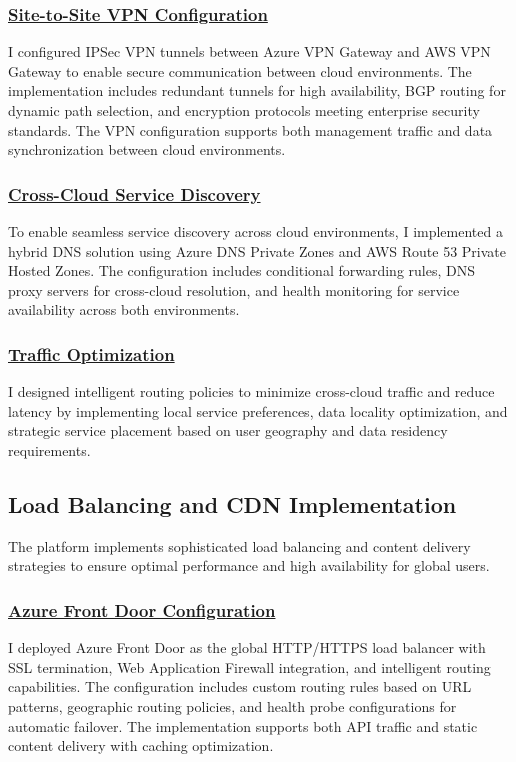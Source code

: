 \subsubsection*{\underline{Site-to-Site VPN Configuration}}
I configured IPSec VPN tunnels between Azure VPN Gateway and AWS VPN Gateway to enable secure communication between cloud environments. The implementation includes redundant tunnels for high availability, BGP routing for dynamic path selection, and encryption protocols meeting enterprise security standards. The VPN configuration supports both management traffic and data synchronization between cloud environments.

\subsubsection*{\underline{Cross-Cloud Service Discovery}}
To enable seamless service discovery across cloud environments, I implemented a hybrid DNS solution using Azure DNS Private Zones and AWS Route 53 Private Hosted Zones. The configuration includes conditional forwarding rules, DNS proxy servers for cross-cloud resolution, and health monitoring for service availability across both environments.

\subsubsection*{\underline{Traffic Optimization}}
I designed intelligent routing policies to minimize cross-cloud traffic and reduce latency by implementing local service preferences, data locality optimization, and strategic service placement based on user geography and data residency requirements.

\subsection{Load Balancing and CDN Implementation}
The platform implements sophisticated load balancing and content delivery strategies to ensure optimal performance and high availability for global users.

\subsubsection*{\underline{Azure Front Door Configuration}}
I deployed Azure Front Door as the global HTTP/HTTPS load balancer with SSL termination, Web Application Firewall integration, and intelligent routing capabilities. The configuration includes custom routing rules based on URL patterns, geographic routing policies, and health probe configurations for automatic failover. The implementation supports both API traffic and static content delivery with caching optimization.


